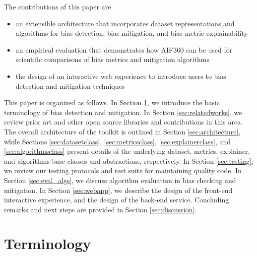 \documentclass{article}
\begin{document}
The contributions of this paper are
\begin{itemize}
    \item an extensible architecture that incorporates dataset representations and algorithms for  bias detection, bias mitigation, and bias metric explainability
    \item an empirical evaluation that demonstrates how AIF360 can be used for scientific comparisons of bias metrics and mitigation algorithms
    \item the design of an interactive web experience to introduce users to bias detection and mitigation techniques

\end{itemize}

This paper is organized as follows. In Section \ref{sec:terminology}, we introduce the basic terminology of bias detection and mitigation. In Section \ref{sec:relatedworks}, we review prior art and other open source libraries and contributions in this area. The overall architecture of the toolkit is outlined in Section \ref{sec:architecture}, while Sections \ref{sec:datasetclass}, \ref{sec:metricsclass}, \ref{sec:explainerclass}, and \ref{sec:algorithmsclass} present details of the underlying dataset, metrics, explainer, and algorithms base classes and abstractions, respectively. In Section \ref{sec:testing}, we review our testing protocols and test suite for maintaining quality code. In Section \ref{sec:eval_algs}, we discuss algorithm evaluation in bias checking and mitigation. In Section \ref{sec:webapp}, we describe the design of the front-end interactive experience, and the design of the back-end service. Concluding remarks and next steps are provided in Section \ref{sec:discussion}.


\section{Terminology}
\label{sec:terminology}
\end{document}
